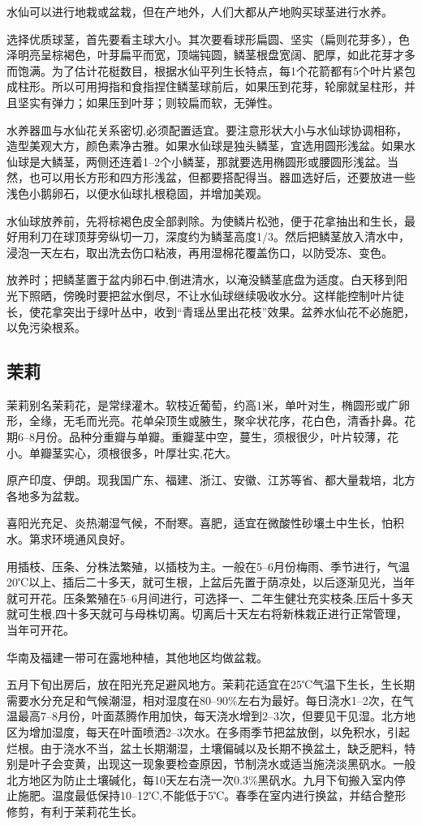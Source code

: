 \documentclass{ctexbook}
\begin{document}
水仙可以进行地栽或盆栽，但在产地外，人们大都从产地购买球茎进行水养。

选择优质球茎，首先要看主球大小。其次要看球形扁圆、坚实（扁则花芽多），色泽明亮呈棕褐色，叶芽扁平而宽，顶端钝圆，鳞茎根盘宽阔、肥厚，如此花芽才多而饱满。为了估计花梃数目，根据水仙平列生长特点，每1个花箭都有5个叶片紧包成柱形。所以可用拇指和食指捏住鳞茎球前后，如果压到花芽，轮廓就呈柱形，并且坚实有弹力；如果压到叶芽；则较扁而软，无弹性。

水养器皿与水仙花关系密切,必须配置适宜。要注意形状大小与水仙球协调相称，造型美观大方，颜色素净古雅。如果水仙球是独头鳞茎，宜选用圆形浅盆。如果水仙球是大鳞茎，两侧还连着1--2个小鳞茎，那就要选用椭圆形或腰圆形浅盆。当然，也可以用长方形和四方形浅盆，但都要搭配得当。器皿选好后，还要放进一些浅色小鹅卵石，以便水仙球扎根稳固，并增加美观。

水仙球放养前，先将棕褐色皮全部剥除。为使鳞片松弛，便于花拿抽出和生长，最好用利刀在球顶芽旁纵切一刀，深度约为鳞茎高度1/3。然后把鳞茎放入清水中，浸泡一天左右，取出洗去伤口粘液，再用湿棉花覆盖伤口，以防受冻、变色。

放养时；把鳞茎置于盆内卵石中,倒进清水，以淹没鳞茎底盘为适度。白天移到阳光下照晒，傍晚时要把盆水倒尽，不让水仙球继续吸收水分。这样能控制叶片徒长，使花拿突出于绿叶丛中，收到“青瑶丛里出花枝”效果。盆养水仙花不必施肥，以免污染根系。

\subsection{茉莉}
茉莉别名茉莉花，是常绿灌木。软枝近葡萄，约高1米，单叶对生，椭圆形或广卵形，全缘，无毛而光亮。花单朵顶生或腋生，聚伞状花序，花白色，清香扑鼻。花期6--8月份。品种分重瓣与单瓣。重瓣茎中空，蔓生，须根很少，叶片较薄，花小。单瓣茎实心，须根很多，叶厚壮实,花大。

原产印度、伊朗。现我国广东、福建、浙江、安徽、江苏等省、都大量栽培，北方各地多为盆栽。

喜阳光充足、炎热潮湿气候，不耐寒。喜肥，适宜在微酸性砂壤土中生长，怕积水。第求环境通风良好。

用插枝、压条、分株法繁殖，以插枝为主。一般在5--6月份梅雨、季节进行，气温20℃以上、插后二十多天，就可生根，上盆后先置于荫凉处，以后逐渐见光，当年就可开花。压条繁殖在5--6月间进行，可选择一、二年生健壮充实枝条,压后十多天就可生根,四十多天就可与母株切离。切离后十天左右将新株栽正进行正常管理，当年可开花。

华南及福建一带可在露地种植，其他地区均做盆栽。

五月下旬出房后，放在阳光充足避风地方。茉莉花适宜在25℃气温下生长，生长期需要水分充足和气候潮湿，相对湿度在80--90\%左右为最好。每日浇水1--2次，在气温最高7--8月份，叶面蒸腾作用加快，每天浇水增到2--3次，但要见干见湿。北方地区为增加湿度，每天在叶面喷洒2--3次水。在多雨季节把盆放倒，以免积水，引起烂根。由于浇水不当，盆土长期潮湿，土壤偏碱以及长期不换盆土，缺乏肥料，特别是叶子会变黄，出现这一现象要检查原因，节制浇水或适当施浇淡黑矾水。一般北方地区为防止土壤碱化，每10天左右浇一次0.3\%黑矾水。九月下旬搬入室内停止施肥。温度最低保持10--12℃,不能低于5℃。春季在室内进行换盆，并结合整形修剪，有利于茉莉花生长。
\end{document}
